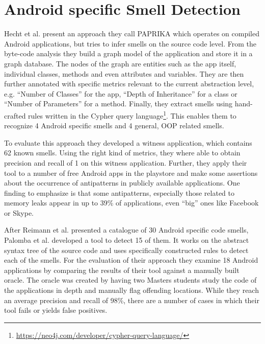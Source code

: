 
\section{Android specific Smell Detection}



Hecht et al. \cite{hecht2015detecting} present an approach they call PAPRIKA which operates on compiled Android applications, but tries to infer smells on the source code level.
From the byte-code analysis they build a graph model of the application and store it in a graph database.
The nodes of the graph are entities such as the app itself, individual classes, methods and even attributes and variables.
They are then further annotated with specific metrics relevant to the current abstraction level, e.g. ``Number of Classes'' for the app, ``Depth of Inheritance'' for a class or ``Number of Parameters'' for a method.
Finally, they extract smells using hand-crafted rules written in the Cypher query language\footnote{\url{https://neo4j.com/developer/cypher-query-language/}}.
This enables them to recognize 4 Android specific smells and 4 general, OOP related smells.

To evaluate this approach they developed a witness application, which contains 62 known smells.
Using the right kind of metrics, they where able to obtain precision and recall of 1 on this witness application.
Further, they apply their tool to a number of free Android apps in the playstore and make some assertions about the occurrence of antipatterns in publicly available applications.
One finding to emphasize is that some antipatterns, especially those related to memory leaks appear in up to 39\% of applications, even ``big'' ones like Facebook or Skype.

After Reimann et al. \cite{reimann2014tool} presented a catalogue of 30 Android specific code smells, Palomba et al. \cite{palomba2017lightweight} developed a tool to detect 15 of them.
It works on the abstract syntax tree of the source code and uses specifically constructed rules to detect each of the smells.
For the evaluation of their approach they examine 18 Android applications by comparing the results of their tool against a manually built oracle.
The oracle was created by having two Masters students study the code of the applications in depth and manually flag offending locations.
While they reach an average precision and recall of 98\%, there are a number of cases in which their tool fails or yields false positives.

